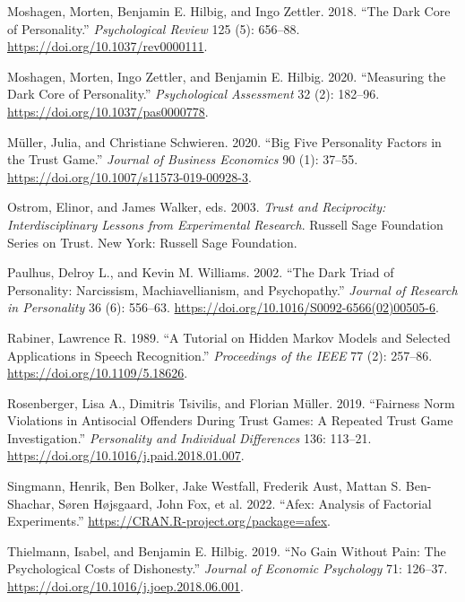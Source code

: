 \documentclass[
]{article}
\newlength{\cslhangindent}
\newenvironment{CSLReferences}[2] %
 {\begin{list}{}{%
  \setlength{\itemindent}{0pt}
  \setlength{\leftmargin}{0pt}
  \setlength{\parsep}{0pt}
  \ifodd #1
   \setlength{\leftmargin}{\cslhangindent}
   \setlength{\itemindent}{-1\cslhangindent}
  \fi
  \setlength{\itemsep}{#2\baselineskip}}}
 {\end{list}}
\begin{document}
\begin{CSLReferences}{1}{0}
Moshagen, Morten, Benjamin E. Hilbig, and Ingo Zettler. 2018. {``The Dark Core of Personality.''} \emph{Psychological Review} 125 (5): 656--88. \url{https://doi.org/10.1037/rev0000111}.

Moshagen, Morten, Ingo Zettler, and Benjamin E. Hilbig. 2020. {``Measuring the Dark Core of Personality.''} \emph{Psychological Assessment} 32 (2): 182--96. \url{https://doi.org/10.1037/pas0000778}.

Müller, Julia, and Christiane Schwieren. 2020. {``Big Five Personality Factors in the Trust Game.''} \emph{Journal of Business Economics} 90 (1): 37--55. \url{https://doi.org/10.1007/s11573-019-00928-3}.

Ostrom, Elinor, and James Walker, eds. 2003. \emph{Trust and Reciprocity: Interdisciplinary Lessons from Experimental Research}. Russell Sage Foundation Series on Trust. New York: Russell Sage Foundation.

Paulhus, Delroy L., and Kevin M. Williams. 2002. {``The Dark Triad of Personality: Narcissism, Machiavellianism, and Psychopathy.''} \emph{Journal of Research in Personality} 36 (6): 556--63. \url{https://doi.org/10.1016/S0092-6566(02)00505-6}.

Rabiner, Lawrence R. 1989. {``A Tutorial on Hidden Markov Models and Selected Applications in Speech Recognition.''} \emph{Proceedings of the IEEE} 77 (2): 257--86. \url{https://doi.org/10.1109/5.18626}.

Rosenberger, Lisa A., Dimitris Tsivilis, and Florian Müller. 2019. {``Fairness Norm Violations in Antisocial Offenders During Trust Games: {A} Repeated Trust Game Investigation.''} \emph{Personality and Individual Differences} 136: 113--21. \url{https://doi.org/10.1016/j.paid.2018.01.007}.

Singmann, Henrik, Ben Bolker, Jake Westfall, Frederik Aust, Mattan S. Ben-Shachar, Søren Højsgaard, John Fox, et al. 2022. {``Afex: Analysis of Factorial Experiments.''} \url{https://CRAN.R-project.org/package=afex}.

Thielmann, Isabel, and Benjamin E. Hilbig. 2019. {``No Gain Without Pain: {The} Psychological Costs of Dishonesty.''} \emph{Journal of Economic Psychology} 71: 126--37. \url{https://doi.org/10.1016/j.joep.2018.06.001}.


\end{CSLReferences}
\end{document}
